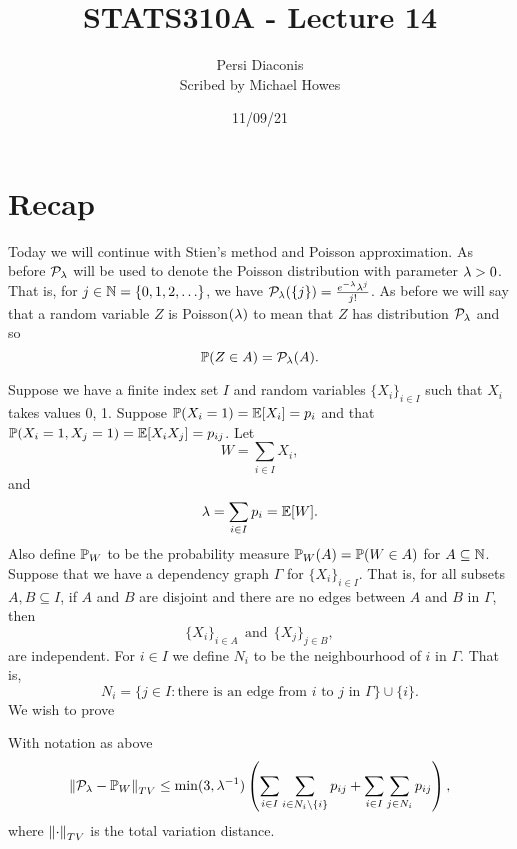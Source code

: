 




\title{STATS310A - Lecture 14}
\author{Persi Diaconis\\ Scribed by Michael Howes}
\date{11/09/21}

\pagestyle{fancy}
\fancyhf{}


\maketitle
\tableofcontents
\section{Recap}
Today we will continue with Stien's method and Poisson approximation. As before ${\mathcal{P}}_\lambda$ will be used to denote the Poisson distribution with parameter $\lambda > 0$. That is, for $j \in {{\mathbb N}} = \{0,1,2,\ldots\}$, we have ${\mathcal{P}}_\lambda(\{j\}) = \frac{e^{-\lambda}\lambda^j}{j!}$. As before we will say that a random variable $Z$ is Poisson$(\lambda)$ to mean that $Z$ has distribution ${\mathcal{P}}_\lambda$ and so  
\[{\mathbb{P}}(Z \in A) = {\mathcal{P}}_\lambda(A). \]


Suppose we have a finite index set $I$ and random variables $\{X_i\}_{i \in I}$ such that $X_i$ takes values 0, 1. Suppose ${\mathbb{P}}(X_i=1)={\mathbb{E}}[X_i]=p_i$ and that ${\mathbb{P}}(X_i=1,X_j=1) = {\mathbb{E}}[X_iX_j] = p_{ij}$. Let 
\[W = \sum_{i\in I}X_i, \]
and
\[\lambda = \sum_{i \in I}p_i = {\mathbb{E}}[W]. \]
Also define ${\mathbb{P}}_W$ to be the probability measure ${\mathbb{P}}_W(A) = {\mathbb{P}}(W \in A)$ for $A \subseteq {{\mathbb N}}$. Suppose that we have a dependency graph $\Gamma$ for $\{X_i\}_{i \in I}$. That is, for all subsets $A,B \subseteq I$, if $A$ and $B$ are disjoint and there are no edges between $A$ and $B$ in $\Gamma$, then 
\[\{X_i\}_{i \in A} ~~ \text{and}~~ \{X_j\}_{j \in B}, \]
are independent. For $i \in I$ we define $N_i$ to be the neighbourhood of $i$ in $\Gamma$. That is,
\[N_i = \{j \in I : \text{there is an edge from $i$ to $j$ in $\Gamma$}\} \cup \{i\}. \]
We wish to prove
\begin{thrm}
    With notation as above
    \[\left\|{\mathcal{P}}_\lambda-{\mathbb{P}}_W\right\|_{TV} \le \min(3,\lambda^{-1})\left(\sum_{i \in I}\sum_{i \in N_i \setminus \{i\}}p_{ij}+\sum_{i \in I}\sum_{j \in N_i}p_{ij}\right),\] 
    where $\left\|\cdot\right\|_{TV}$ is the total variation distance.
\end{thrm}
